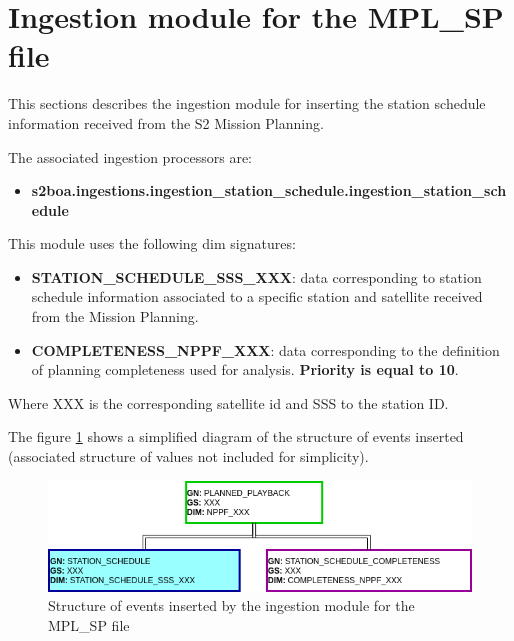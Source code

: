\section{Ingestion module for the MPL\_SP file}

This sections describes the ingestion module for inserting the station schedule information received from the S2 Mission Planning.

The associated ingestion processors are:

\begin{itemize} 

\item \textbf{s2boa.ingestions.ingestion\_station\_schedule.ingestion\_station\_schedule}
  
\end{itemize}

This module uses the following \acrshort{dim} signatures:

\begin{itemize} 

\item \textbf{STATION\_SCHEDULE\_SSS\_XXX}: data corresponding to station schedule information associated to a specific station and satellite received from the Mission Planning.

\item \textbf{COMPLETENESS\_NPPF\_XXX}: data corresponding to the definition of planning completeness used for analysis. \textbf{Priority is equal to 10}.
  
\end{itemize}

Where XXX is the corresponding satellite id and SSS to the station ID.

The figure \ref{fg:structure_ingestion_station_schedule} shows a simplified diagram of the structure of events inserted (associated structure of values not included for simplicity).

\begin{figure}[H]
  \begin{center}
	\centering\includegraphics[width=150mm]{../fig/structure_ingestion_station_schedule.png}
	\caption{Structure of events inserted by the ingestion module for the MPL\_SP file}
	\label{fg:structure_ingestion_station_schedule}
  \end{center}
\end{figure}


